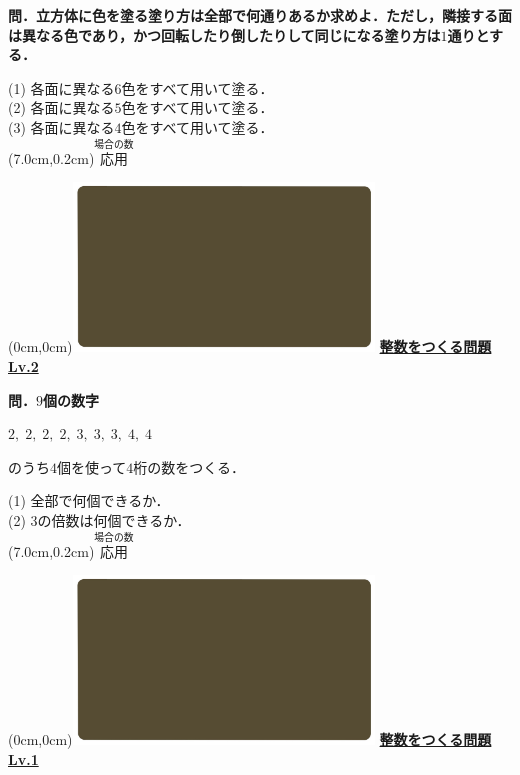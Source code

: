 \documentclass[10pt,
fleqn,
dvipdfmx,
uplatex
]{jsarticle}
\begin{document}
\small 
\bf\boldmath 問．立方体に色を塗る塗り方は全部で何通りあるか求めよ．ただし，隣接する面は異なる色であり，かつ回転したり倒したりして同じになる塗り方は$1$通りとする．

\large
\hspace{-0.1zw}(1)\hspace{-0.2zw}  各面に異なる$6$色をすべて用いて塗る．\\
\hspace{-0.1zw}(2)\hspace{-0.2zw}   各面に異なる$5$色をすべて用いて塗る．\\
\hspace{-0.1zw}(3)\hspace{-0.2zw}   各面に異なる$4$色をすべて用いて塗る．\\

\at(7.0cm,0.2cm){\small\color{bradorange}$\overset{\text{場合の数}}{\text{応用}}$}


\newpage



\at(0cm,0cm){\includegraphics[width=8cm,bb=0 0 1920 1080]{./youtube/thumbnails/templates/smart_background/場合の数.jpeg}}
{\color{orange}\bf\boldmath\Large\underline{整数をつくる問題 Lv.2 }}\vspace{0.3zw}

\normalsize 
\bf\boldmath 問．$9$個の数字

\LARGE 
\vspace{-0.5zw}
\hspace{0.1zw}
$2,\;2,\;2,\;2,\;3,\;3,\;3,\;4,\;4$

\normalsize 
のうち$4$個を使って$4$桁の数をつくる．

\Large
(1)  全部で何個できるか．\\
(2)  $3$の倍数は何個できるか．\\

\at(7.0cm,0.2cm){\small\color{bradorange}$\overset{\text{場合の数}}{\text{応用}}$}


\newpage



\at(0cm,0cm){\includegraphics[width=8cm,bb=0 0 1920 1080]{./youtube/thumbnails/templates/smart_background/場合の数.jpeg}}
{\color{orange}\bf\boldmath\Large\underline{整数をつくる問題 Lv.1 }}\vspace{0.0zw}
\end{document}
